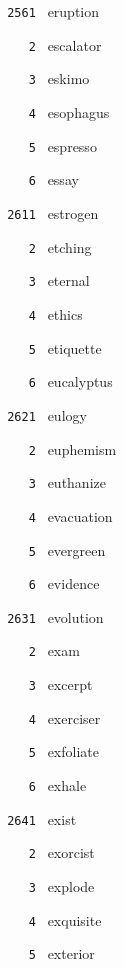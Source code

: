 \documentclass[11pt]{article}
\begin{document}
\begin{multicols}{6}
\vspace{3mm}
\noindent \texttt{ 2561 } eruption  \par
\noindent \texttt{ \ \ \ 2 } escalator  \par
\noindent \texttt{ \ \ \ 3 } eskimo  \par
\noindent \texttt{ \ \ \ 4 } esophagus  \par
\noindent \texttt{ \ \ \ 5 } espresso  \par
\noindent \texttt{ \ \ \ 6 } essay  \par
\noindent \texttt{ 2611 } estrogen  \par
\noindent \texttt{ \ \ \ 2 } etching  \par
\noindent \texttt{ \ \ \ 3 } eternal  \par
\noindent \texttt{ \ \ \ 4 } ethics  \par
\noindent \texttt{ \ \ \ 5 } etiquette  \par
\noindent \texttt{ \ \ \ 6 } eucalyptus  \par
\vspace{3mm}
\noindent \texttt{ 2621 } eulogy  \par
\noindent \texttt{ \ \ \ 2 } euphemism  \par
\noindent \texttt{ \ \ \ 3 } euthanize  \par
\noindent \texttt{ \ \ \ 4 } evacuation  \par
\noindent \texttt{ \ \ \ 5 } evergreen  \par
\noindent \texttt{ \ \ \ 6 } evidence  \par
\vspace{3mm}
\noindent \texttt{ 2631 } evolution  \par
\noindent \texttt{ \ \ \ 2 } exam  \par
\noindent \texttt{ \ \ \ 3 } excerpt  \par
\noindent \texttt{ \ \ \ 4 } exerciser  \par
\noindent \texttt{ \ \ \ 5 } exfoliate  \par
\noindent \texttt{ \ \ \ 6 } exhale  \par
\vspace{3mm}
\noindent \texttt{ 2641 } exist  \par
\noindent \texttt{ \ \ \ 2 } exorcist  \par
\noindent \texttt{ \ \ \ 3 } explode  \par
\noindent \texttt{ \ \ \ 4 } exquisite  \par
\noindent \texttt{ \ \ \ 5 } exterior  \par

\end{multicols}
\end{document}
